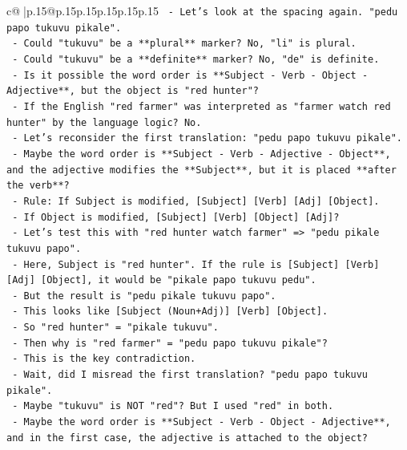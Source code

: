 \documentclass{article}
\begin{document}
{\begin{supertabular}{c@{$\;$}|p{.15\linewidth}@{}p{.15\linewidth}p{.15\linewidth}p{.15\linewidth}p{.15\linewidth}p{.15\linewidth}}
{{{\texttt{     {-} Let's look at the spacing again. "pedu papo tukuvu pikale".} \\
\texttt{     {-} Could "tukuvu" be a **plural** marker? No, "li" is plural.} \\
\texttt{     {-} Could "tukuvu" be a **definite** marker? No, "de" is definite.} \\
\texttt{     {-} Is it possible the word order is **Subject {-} Verb {-} Object {-} Adjective**, but the object is "red hunter"?} \\
\texttt{       {-} If the English "red farmer" was interpreted as "farmer watch red hunter" by the language logic? No.} \\
\texttt{     {-} Let's reconsider the first translation: "pedu papo tukuvu pikale".} \\
\texttt{     {-} Maybe the word order is **Subject {-} Verb {-} Adjective {-} Object**, and the adjective modifies the **Subject**, but it is placed **after the verb**?} \\
\texttt{       {-} Rule: If Subject is modified, {[}Subject{]} {[}Verb{]} {[}Adj{]} {[}Object{]}.} \\
\texttt{       {-} If Object is modified, {[}Subject{]} {[}Verb{]} {[}Object{]} {[}Adj{]}?} \\
\texttt{       {-} Let's test this with "red hunter watch farmer" => "pedu pikale tukuvu papo".} \\
\texttt{       {-} Here, Subject is "red hunter". If the rule is {[}Subject{]} {[}Verb{]} {[}Adj{]} {[}Object{]}, it would be "pikale papo tukuvu pedu".} \\
\texttt{       {-} But the result is "pedu pikale tukuvu papo".} \\
\texttt{       {-} This looks like {[}Subject (Noun+Adj){]} {[}Verb{]} {[}Object{]}.} \\
\texttt{       {-} So "red hunter" = "pikale tukuvu".} \\
\texttt{       {-} Then why is "red farmer" = "pedu papo tukuvu pikale"?} \\
\texttt{       {-} This is the key contradiction.} \\
\texttt{       {-} Wait, did I misread the first translation? "pedu papo tukuvu pikale".} \\
\texttt{       {-} Maybe "tukuvu" is NOT "red"? But I used "red" in both.} \\
\texttt{       {-} Maybe the word order is **Subject {-} Verb {-} Object {-} Adjective**, and in the first case, the adjective is attached to the object?} \\
}}}
\end{supertabular}}
\end{document}
